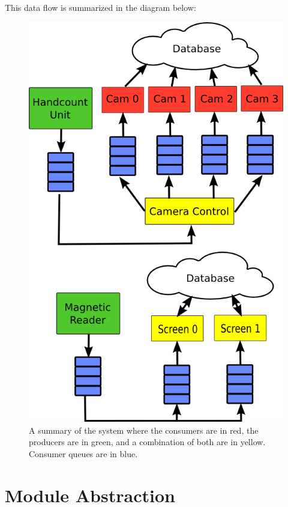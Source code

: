 \documentclass[12pt]{report}
\begin{document}
This data flow is summarized in the diagram below:
\begin{figure}[h]
\centering
\includegraphics[scale=0.50]{system_diagram}
\caption{A summary of the system where the consumers are in red, the producers are in green, and a combination of both are in yellow. Consumer queues are in blue.}
\end{figure}

\newpage\thispagestyle{fancy}\sectionfont{\scshape}
\section*{Module Abstraction}
\end{document}
